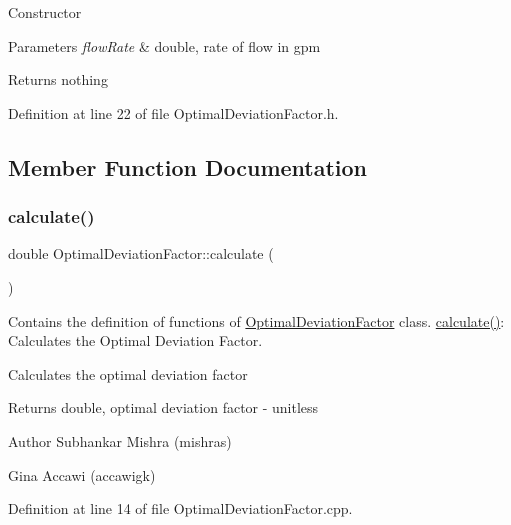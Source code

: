 Constructor 
\begin{DoxyParams}{Parameters}
{\em flow\+Rate} & double, rate of flow in gpm \\
\hline
\end{DoxyParams}
\begin{DoxyReturn}{Returns}
nothing 
\end{DoxyReturn}


Definition at line 22 of file Optimal\+Deviation\+Factor.\+h.



\subsection{Member Function Documentation}
\mbox{\label{class_optimal_deviation_factor_aaa6687bb46d275c4cbcfe44caf895a37}} 
\subsubsection{\texorpdfstring{calculate()}{calculate()}\hspace{0.1cm}{\footnotesize\ttfamily [1/3]}}
{\footnotesize\ttfamily double Optimal\+Deviation\+Factor\+::calculate (\begin{DoxyParamCaption}{ }\end{DoxyParamCaption})}



Contains the definition of functions of \hyperlink{class_optimal_deviation_factor}{Optimal\+Deviation\+Factor} class. \hyperlink{class_optimal_deviation_factor_aaa6687bb46d275c4cbcfe44caf895a37}{calculate()}\+: Calculates the Optimal Deviation Factor. 

Calculates the optimal deviation factor

\begin{DoxyReturn}{Returns}
double, optimal deviation factor -\/ unitless
\end{DoxyReturn}
\begin{DoxyAuthor}{Author}
Subhankar Mishra (mishras) 

Gina Accawi (accawigk) 
\end{DoxyAuthor}


Definition at line 14 of file Optimal\+Deviation\+Factor.\+cpp.

\mbox{\label{class_optimal_deviation_factor_aaa6687bb46d275c4cbcfe44caf895a37}} 

